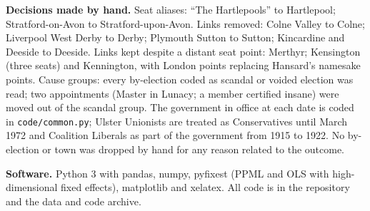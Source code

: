 \documentclass[11pt,a4paper]{article}
\begin{document}
\textbf{Decisions made by hand.} Seat aliases: ``The Hartlepools'' to Hartlepool; Stratford-on-Avon to Stratford-upon-Avon. Links removed: Colne Valley to Colne; Liverpool West Derby to Derby; Plymouth Sutton to Sutton; Kincardine and Deeside to Deeside. Links kept despite a distant seat point: Merthyr; Kensington (three seats) and Kennington, with London points replacing Hansard's namesake points. Cause groups: every by-election coded as scandal or voided election was read; two appointments (Master in Lunacy; a member certified insane) were moved out of the scandal group. The government in office at each date is coded in \texttt{code/common.py}; Ulster Unionists are treated as Conservatives until March 1972 and Coalition Liberals as part of the government from 1915 to 1922. No by-election or town was dropped by hand for any reason related to the outcome.

\textbf{Software.} Python 3 with pandas, numpy, pyfixest (PPML and OLS with high-dimensional fixed effects), matplotlib and xelatex. All code is in the repository and the data and code archive.
\end{document}
